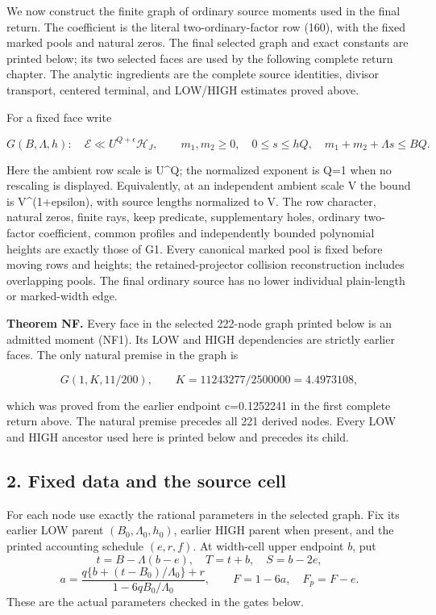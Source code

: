 We now construct the finite graph of ordinary source moments used in the final return. The coefficient is the literal two-ordinary-factor row (160), with the fixed marked pools and natural zeros. The final selected graph and exact constants are printed below; its two selected faces are used by the following complete return chapter. The analytic ingredients are the complete source identities, divisor transport, centered terminal, and LOW/HIGH estimates proved above.

For a fixed face write

\[
G(B,\Lambda,h):\quad
\mathcal E\ll U^{Q+\epsilon}\mathcal H_J,
\qquad m_1,m_2\ge0,\quad0\le s\le hQ,\quad
m_1+m_2+\Lambda s\le BQ.
\tag{NF1}
\]

Here the ambient row scale is U\^{}Q; the normalized exponent is Q=1 when no rescaling is displayed. Equivalently, at an independent ambient scale V the bound is V\^{}(1+epsilon), with source lengths normalized to V. The row character, natural zeros, finite rays, keep predicate, supplementary holes, ordinary two-factor coefficient, common profiles and independently bounded polynomial heights are exactly those of G1. Every canonical marked pool is fixed before moving rows and heights; the retained-projector collision reconstruction includes overlapping pools. The final ordinary source has no lower individual plain-length or marked-width edge.

\textbf{Theorem NF.} Every face in the selected 222-node graph printed below is an admitted moment (NF1). Its LOW and HIGH dependencies are strictly earlier faces. The only natural premise in the graph is

\[
G(1,K,11/200),\qquad K=11243277/2500000=4.4973108,
\tag{NF2}
\]

which was proved from the earlier endpoint c=0.1252241 in the first complete return above. The natural premise precedes all 221 derived nodes. Every LOW and HIGH ancestor used here is printed below and precedes its child.

\hypertarget{feedback:fixed-data-and-the-source-cell}{%
\subsection{2. Fixed data and the source cell}\label{feedback:fixed-data-and-the-source-cell}}

For each node use exactly the rational parameters in the selected graph. Fix its earlier LOW parent \((B_0,\Lambda_0,h_0)\), earlier HIGH parent when present, and the printed accounting schedule \((e,r,f)\). At width-cell upper endpoint \(b\), put \[
 t=B-\Lambda(b-e),\quad T=t+b,\quad S=b-2e,
\] \[
 a=\frac{q\{b+(t-B_0)/\Lambda_0\}+r}
        {1-6qB_0/\Lambda_0},\qquad F=1-6a,\quad F_p=F-e.
 \tag{NF4}
\] These are the actual parameters checked in the gates below.

